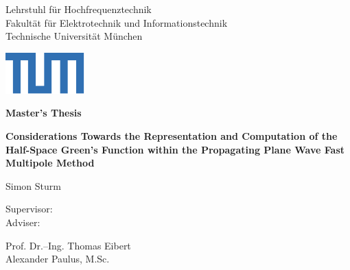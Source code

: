 \begin{titlepage}
	

	\newcommand{\UniversitaetLogoBreite}{19mm}
	\newcommand{\UniversitaetLogoHoehe}{1cm}

	\linespread{1}	
	\vspace*{-1cm}
    
	\setlength{\parindent}{0cm} 
	\begin{center}
		\begin{minipage}[l]{\textwidth-\UniversitaetLogoBreite}
			{ \footnotesize \color{TUMBlau}
				{\selectfont \small
					\textsf{Lehrstuhl für Hochfrequenztechnik\\
					Fakultät für Elektrotechnik und Informationstechnik\\
					Technische Universität München}\par}
			}
		\end{minipage}%
		\begin{minipage}[r]{\UniversitaetLogoBreite} %
			\includegraphics[width=\textwidth]{./titlepage/TUM_Logo_Web.pdf}
		\end{minipage}%
	\end{center}%
		
	\vspace{5cm}
	\Huge
	\textbf{Master's Thesis}
	\vspace{1.5cm}
	\LARGE
	\begin{flushleft}	
		\textbf{Considerations Towards the Representation and Computation
		of the Half-Space Green's Function within the Propagating Plane Wave
		Fast Multipole Method}
	\end{flushleft}
	\vspace{1cm}
	Simon Sturm 
	\qquad \qquad
	\\
	[2cm] 
	\large	
	\parbox[b][3cm][t]{2.2cm}{
		Supervisor: \\
	    Adviser: }
	\parbox[b][3cm][t]{6cm}{
		Prof. Dr.--Ing. Thomas Eibert\\
		Alexander Paulus, M.Sc.
		}				

\end{titlepage}	 
